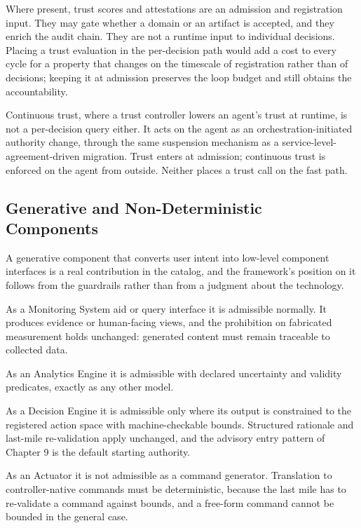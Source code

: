 Where present, trust scores and attestations are an admission and
registration input. They may gate whether a domain or an artifact is
accepted, and they enrich the audit chain. They are not a runtime input
to individual decisions. Placing a trust evaluation in the per-decision
path would add a cost to every cycle for a property that changes on the
timescale of registration rather than of decisions; keeping it at
admission preserves the loop budget and still obtains the
accountability.

Continuous trust, where a trust controller lowers an agent's trust at
runtime, is not a per-decision query either. It acts on the agent as an
orchestration-initiated authority change, through the same suspension
mechanism as a service-level-agreement-driven migration. Trust enters at
admission; continuous trust is enforced on the agent from outside.
Neither places a trust call on the fast path.

\hypertarget{generative-and-non-deterministic-components}{%
\subsection{Generative and Non-Deterministic Components}\label{generative-and-non-deterministic-components}}

A generative component that converts user intent into low-level
component interfaces is a real contribution in the catalog, and the
framework's position on it follows from the guardrails rather than from
a judgment about the technology.

As a Monitoring System aid or query interface it is admissible normally.
It produces evidence or human-facing views, and the prohibition on
fabricated measurement holds unchanged: generated content must remain
traceable to collected data.

As an Analytics Engine it is admissible with declared uncertainty and
validity predicates, exactly as any other model.

As a Decision Engine it is admissible only where its output is
constrained to the registered action space with machine-checkable
bounds. Structured rationale and last-mile re-validation apply
unchanged, and the advisory entry pattern of Chapter 9 is the default
starting authority.

As an Actuator it is not admissible as a command generator. Translation
to controller-native commands must be deterministic, because the last
mile has to re-validate a command against bounds, and a free-form
command cannot be bounded in the general case.

